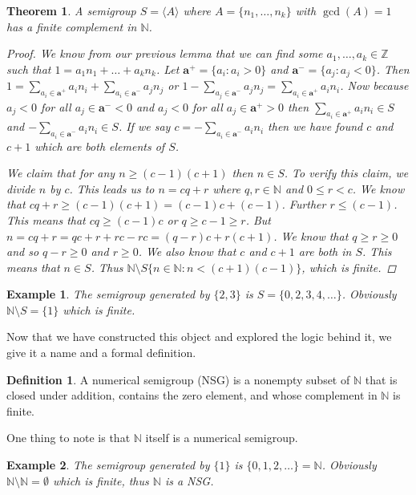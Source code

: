 \documentclass[11pt]{amsart}
\theoremstyle{plain}
\newtheorem{thm}{Theorem}
\newtheorem{exa}{Example}
\theoremstyle{definition}
\newtheorem{defi}{Definition}
\begin{document}
\begin{thm}
A semigroup $S=\langle A\rangle$ where $A=\{n_1,\dots,n_k\}$ with $\gcd(A)=1$ has a finite complement in $\mathbb{N}$.
\begin{proof}
We know from our previous lemma that we can find some $a_1,\dots,a_k\in \mathbb{Z}$ such that $1=a_1n_1+\dots+a_kn_k$.
Let $\mathbf{a^+}=\{a_i:a_i>0\}$ and $\mathbf{a^-}=\{a_j:a_j<0\}$.
Then $1=\sum\limits_{a_i\in\mathbf{a^+}}{a_in_i}+\sum\limits_{a_i\in\mathbf{a^-}}{a_jn_j}$ or $1-\sum\limits_{a_j\in\mathbf{a^-}}
{a_jn_j}=\sum\limits_{a_i\in\mathbf{a^+}}{a_in_i}$. Now because $a_j<0$ for all
$a_j\in \mathbf{a^-}<0$ and $a_j<0$ for all $a_j\in \mathbf{a^+}>0$ then $\sum\limits_{a_i\in\mathbf{a^+}}
{a_in_i}\in S$ and $-\sum\limits_{a_i\in\mathbf{a^-}}{a_in_i}\in
S$. If we say $c=-\sum\limits_{a_i\in\mathbf{a^-}}{a_in_i}$
then we have found $c$ and $c+1$ which are both elements of $S$.

We claim that for any $n\ge (c-1)(c+1)$ then $n\in S$. To verify
this claim, we divide $n$ by $c$. This leads us to $n=cq+r$ where
$q,r\in \mathbb{N}$ and $0\le r<c$. We know that $cq+r\ge(c-1)(c+1)=(c-1)c+(c-1)$.
Further $r\le (c-1)$. This means that $cq\ge (c-1)c$ or $q\ge c-1\ge r$. But
$n=cq+r=qc+r+rc-rc=(q-r)c+r(c+1)$. We know that $q\ge r\ge 0$ and so $q-r\ge 0$
and $r\ge 0$. We also know that $c$ and $c+1$ are both in $S$.
This means that $n\in S$. Thus
$\mathbb{N}\setminus S \{n\in \mathbb{N}:n<(c+1)(c-1)\}$, which is
finite.

\end{proof}
\end{thm}
\begin{exa}
  The semigroup generated by $\{2,3\}$ is $S=\{0,2,3,4,\dots \}$. Obviously
  $\mathbb{N}\setminus S=\{1\}$ which is finite.
\end{exa}
Now that we have constructed this object and explored the logic behind it, we give it a name and a formal definition.
\begin{defi}\cite{rosales}
  A numerical semigroup (NSG) is a nonempty subset of $\mathbb{N}$ that is closed
under addition, contains the zero element, and whose complement in $\mathbb{N}$
is finite.
\end{defi}
One thing to note is that $\mathbb{N}$ itself is a numerical semigroup.
\begin{exa}
  The semigroup generated by $\{1\}$ is $\{0,1,2,\dots \}=\mathbb{N}$. Obviously
  $\mathbb{N}\setminus \mathbb{N}=\emptyset$ which is finite, thus $\mathbb{N}$
  is a NSG.
\end{exa}
\end{document}
